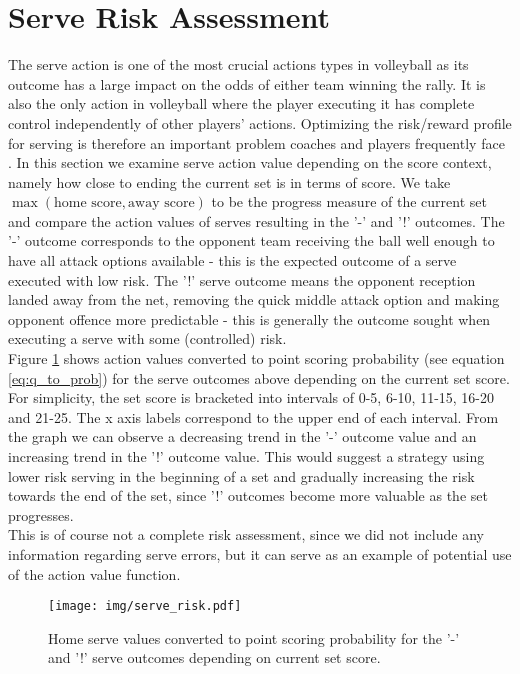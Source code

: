 \documentclass{sfuthesis}
\begin{document}
	\section{Serve Risk Assessment}
	The serve action is one of the most crucial actions types in volleyball as its outcome has a large impact on the odds of either team winning the rally. It is also the only action in volleyball where the player executing it has complete control independently of other players' actions. Optimizing the risk/reward profile for serving is therefore an important problem coaches and players frequently face \cite{burton2015linear}. In this section we examine serve action value depending on the score context, namely how close to ending the current set is in terms of score. We take $\max(\text{home score}, \text{away score})$ to be the progress measure of the current set and compare the action values of serves resulting in the '-' and '!' outcomes. The '-' outcome corresponds to the opponent team receiving the ball well enough to have all attack options available - this is the expected outcome of a serve executed with low risk. The '!' serve outcome means the opponent reception landed away from the net, removing the quick middle attack option and making opponent offence more predictable - this is generally the outcome sought when executing a serve with some (controlled) risk.\\
	Figure \ref{fig:serve-risk} shows action values converted to point scoring probability (see equation \eqref{eq:q_to_prob}) for the serve outcomes above depending on the current set score. For simplicity, the set score is bracketed into intervals of 0-5, 6-10, 11-15, 16-20 and 21-25. The x axis labels correspond to the upper end of each interval. From the graph we can observe a decreasing trend in the '-' outcome value and an increasing trend in the '!' outcome value. This would suggest a strategy using lower risk serving in the beginning of a set and gradually increasing the risk towards the end of the set, since '!' outcomes become more valuable as the set progresses.\\
	This is of course not a complete risk assessment, since we did not include any information regarding serve errors, but it can serve as an example of potential use of the action value function.
	
	\begin{figure}
		\centering
		\texttt{[image: img/serve\_risk.pdf]}
		\caption{Home serve values converted to point scoring probability for the '-' and '!' serve outcomes depending on current set score.}
		\label{fig:serve-risk}
	\end{figure}
	
\end{document}
